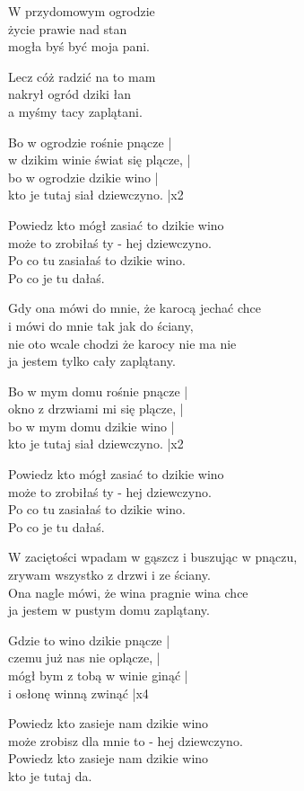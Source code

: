 \begin{text}
    W przydomowym ogrodzie\\
    życie prawie nad stan\\
    mogła byś być moja pani.

    Lecz cóż radzić na to mam\\
    nakrył ogród dziki łan\\
    a myśmy tacy zaplątani.

    \vin Bo w ogrodzie rośnie pnącze |\\
    \vin w dzikim winie świat się plącze, |\\
    \vin bo w ogrodzie dzikie wino |\\
    \vin kto je tutaj siał dziewczyno. |x2

    \vin Powiedz kto mógł zasiać to dzikie wino\\
    \vin może to zrobiłaś ty - hej dziewczyno.\\
    \vin Po co tu zasiałaś to dzikie wino.\\
    \vin Po co je tu dałaś.

    Gdy ona mówi do mnie, że karocą jechać chce\\
    i mówi do mnie tak jak do ściany,\\
    nie oto wcale chodzi że karocy nie ma nie\\
    ja jestem tylko cały zaplątany.

    \vin Bo w mym domu rośnie pnącze |\\
    \vin okno z drzwiami mi się plącze, | \\
    \vin bo w mym domu dzikie wino |\\
    \vin kto je tutaj siał dziewczyno. |x2

    \vin Powiedz kto mógł zasiać to dzikie wino\\
    \vin może to zrobiłaś ty - hej dziewczyno.\\
    \vin Po co tu zasiałaś to dzikie wino.\\
    \vin Po co je tu dałaś.

    W zaciętości wpadam w gąszcz i buszując w pnączu,\\
    zrywam wszystko z drzwi i ze ściany.\\
    Ona nagle mówi, że wina pragnie wina chce\\
    ja jestem w pustym domu zaplątany.

    \vin Gdzie to wino dzikie pnącze |\\
    \vin czemu już nas nie oplącze, |\\
    \vin mógł bym z tobą w winie ginąć |\\
    \vin i osłonę winną zwinąć |x4

    \vin Powiedz kto zasieje nam dzikie wino\\
    \vin może zrobisz dla mnie to - hej dziewczyno.\\
    \vin Powiedz kto zasieje nam dzikie wino\\
    \vin kto je tutaj da.
\end{text}

